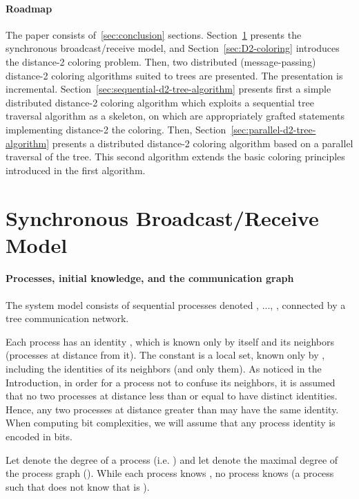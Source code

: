 \documentclass[11pt,english]{article}
\begin{document}
\paragraph{Roadmap}
The paper consists of~\ref{sec:conclusion} sections.
Section~\ref{sec:model} presents the synchronous broadcast/receive
model, and Section~\ref{sec:D2-coloring} introduces the distance-2
coloring problem.  Then, two distributed (message-passing) distance-2
coloring algorithms suited to trees are presented.  The presentation
is incremental.  Section~\ref{sec:sequential-d2-tree-algorithm}
presents first a simple distributed distance-2 coloring algorithm
which exploits a sequential tree traversal algorithm as a skeleton, on
which are appropriately grafted statements implementing distance-2 the
coloring.  Then, Section~\ref{sec:parallel-d2-tree-algorithm} presents
a distributed distance-2 coloring algorithm based on a parallel
traversal of the tree.  This second algorithm extends the basic
coloring principles introduced in the first algorithm.



\section{Synchronous Broadcast/Receive Model}
\label{sec:model}



\paragraph{Processes, initial knowledge, and the communication graph}
The system model consists of  sequential processes denoted 
, ..., , connected by a tree communication network. 

Each process  has an identity , which is known only by
itself and its neighbors (processes at distance  from it).  The
constant  is a local set, known only by , including
the identities of its neighbors (and only them).  As noticed in the
Introduction, in order for a process  not to confuse its
neighbors, it is assumed that no two processes at distance less
than or equal to  have distinct identities.  Hence, any two
processes at distance greater than  may have the same
identity. When computing bit complexities, we will assume that any
process identity is encoded in  bits.

Let  denote the degree of a process 
(i.e. ) and let  denote the maximal degree of
the process graph ().  While each
process  knows , no process knows  (a process
 such that  does not know that  is
).
\end{document}
